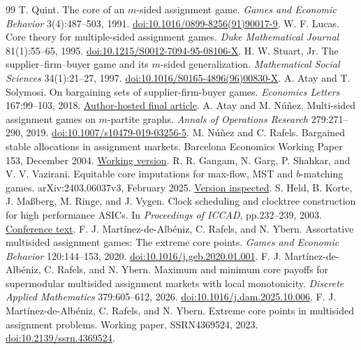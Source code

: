 \documentclass[11pt]{article}
\theoremstyle{remark}\newtheorem{remark}[theorem]{Remark}
\begin{document}
\begin{thebibliography}{99}
\small\setlength{\itemsep}{1pt}
 T. Quint. The core of an $m$-sided assignment game.
\emph{Games and Economic Behavior} 3(4):487--503, 1991.
\href{https://doi.org/10.1016/0899-8256(91)90017-9}{doi:10.1016/0899-8256(91)90017-9}.
 W. F. Lucas. Core theory for multiple-sided assignment
games. \emph{Duke Mathematical Journal} 81(1):55--65, 1995.
\href{https://doi.org/10.1215/S0012-7094-95-08106-X}{doi:10.1215/S0012-7094-95-08106-X}.
 H. W. Stuart, Jr. The supplier--firm--buyer game and
its $m$-sided generalization. \emph{Mathematical Social Sciences}
34(1):21--27, 1997.
\href{https://doi.org/10.1016/S0165-4896(96)00830-X}{doi:10.1016/S0165-4896(96)00830-X}.
 A. Atay and T. Solymosi. On bargaining sets of
supplier-firm-buyer games. \emph{Economics Letters} 167:99--103, 2018.
\href{https://ataatay.github.io/webpage/Atay_Solymosi_2018_EL.pdf}{Author-hosted final article}.
 A. Atay and M. N\'u\~nez. Multi-sided assignment
games on $m$-partite graphs. \emph{Annals of Operations Research}
279:271--290, 2019.
\href{https://doi.org/10.1007/s10479-019-03256-5}{doi:10.1007/s10479-019-03256-5}.
 M. N\'u\~nez and C. Rafels. Bargained stable
allocations in assignment markets. Barcelona Economics Working Paper 153,
December 2004. \href{https://www.bse.eu/sites/default/files/working_paper_pdfs/153.pdf}{Working version}.
 R. R. Gangam, N. Garg, P. Shahkar, and V. V. Vazirani.
Equitable core imputations for max-flow, MST and $b$-matching games.
arXiv:2403.06037v3, February 2025.
\href{https://arxiv.org/abs/2403.06037v3}{Version inspected}.
 S. Held, B. Korte, J. Ma\ss berg, M. Ringe, and
J. Vygen. Clock scheduling and clocktree construction for high performance
ASICs. In \emph{Proceedings of ICCAD}, pp.232--239, 2003.
\href{https://www.cs.york.ac.uk/rts/docs/SIGDA-Compendium-1994-2004/papers/2003/iccad03/pdffiles/03d_4.pdf}{Conference text}.
 F. J. Mart\'inez-de-Alb\'eniz, C. Rafels, and N. Ybern.
Assortative multisided assignment games: The extreme core points.
\emph{Games and Economic Behavior} 120:144--153, 2020.
\href{https://doi.org/10.1016/j.geb.2020.01.001}{doi:10.1016/j.geb.2020.01.001}.
 F. J. Mart\'inez-de-Alb\'eniz, C. Rafels, and N. Ybern.
Maximum and minimum core payoffs for supermodular multisided assignment
markets with local monotonicity. \emph{Discrete Applied Mathematics}
379:605--612, 2026.
\href{https://doi.org/10.1016/j.dam.2025.10.006}{doi:10.1016/j.dam.2025.10.006}.
 F. J. Mart\'inez-de-Alb\'eniz, C. Rafels, and N. Ybern.
Extreme core points in multisided assignment problems. Working paper,
SSRN4369524, 2023.
\href{https://doi.org/10.2139/ssrn.4369524}{doi:10.2139/ssrn.4369524}.
\end{thebibliography}
\end{document}
